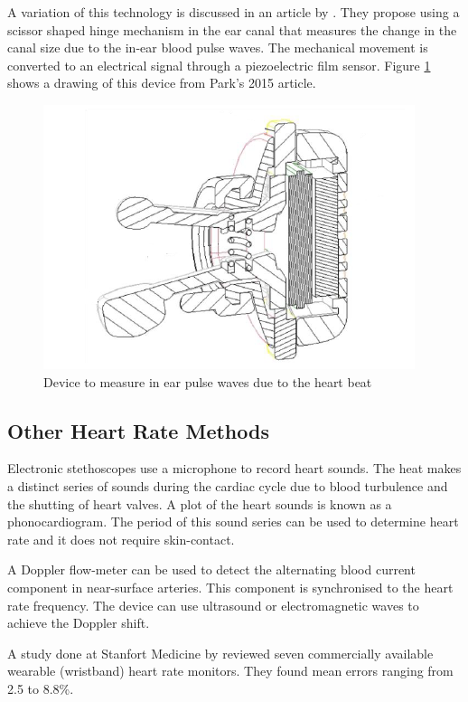 \medskip
A variation of this technology is discussed in an article by \cite{park2015wearable}. They propose using a scissor shaped hinge mechanism in the ear canal that measures the change in the canal size due to the in-ear blood pulse waves. The mechanical movement is converted to an electrical signal through a piezoelectric film sensor. Figure \ref{fig:BCGsensor} shows a drawing of this device from Park's 2015 article.

\begin{figure}[h]
   \centering
   \includegraphics[scale=0.8]{figs/BCGsensor}
   \caption{Device to measure in ear pulse waves due to the heart beat \citep{park2015wearable}}
   \label{fig:BCGsensor}
\end{figure}

\subsection{Other Heart Rate Methods}
Electronic stethoscopes use a microphone to record heart sounds. The heat makes a distinct series of sounds during the cardiac cycle due to blood turbulence and the shutting of heart valves. A plot of the heart sounds is known as a phonocardiogram. The period of this sound series can be used to determine heart rate and it does not require skin-contact.

\medskip
A Doppler flow-meter can be used to detect the alternating blood current component in near-surface arteries. This component is synchronised to the heart rate frequency. The device can use ultrasound or electromagnetic waves to achieve the Doppler shift.

\medskip
A study done at Stanfort Medicine by \cite{shcherbina2017accuracy} reviewed seven commercially available wearable (wristband) heart rate monitors. They found mean errors ranging from 2.5 to 8.8\%.

